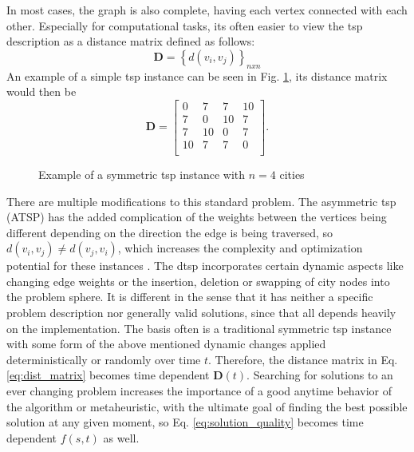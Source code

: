 In most cases, the graph is also complete, having each vertex connected with each other. Especially for computational tasks, its often easier to view the \gls{tsp} description as a distance matrix defined as follows:
\begin{equation} 
	\label{eq:dist_matrix}
	\textbf{D} = \left\lbrace d(v_i,v_j) \right\rbrace_{nxn}
\end{equation}
An example of a simple \gls{tsp} instance can be seen in Fig. \ref{fig:ExampleTSP}, its distance matrix would then be
$$
\textbf{D} =
 \begin{bmatrix}
	0 & 7 &7 & 10\\
	7 & 0 & 10 & 7\\
	7 & 10 & 0 & 7\\
	10 & 7 & 7 & 0\\
\end{bmatrix}
. $$
  \begin{figure}
  	\centering
    \caption{Example of a symmetric \gls{tsp} instance with $n=4$ cities}
    \label{fig:ExampleTSP}
\end{figure}


There are multiple modifications to this standard problem. The asymmetric \gls{tsp} (ATSP) has the added complication of the weights between the vertices being different depending on the direction the edge is being traversed, so $d(v_i, v_j) \neq d(v_j,v_i)$, which increases the complexity and optimization potential for these instances \cite{johnson2007experimental}.
The \gls{dtsp} incorporates certain dynamic aspects like changing edge weights or the insertion, deletion or swapping of city nodes into the problem sphere. It is different in the sense that it has neither a specific problem description nor generally valid solutions, since that all depends heavily on the implementation. The basis often is a traditional symmetric \gls{tsp} instance with some form of the above mentioned dynamic changes applied deterministically or randomly over time $t$. Therefore, the distance matrix in Eq. \eqref{eq:dist_matrix} becomes time dependent $\textbf{D}(t)$. Searching for solutions to an ever changing problem increases the importance of a good anytime behavior of the algorithm or metaheuristic, with the ultimate goal of finding the best possible solution at any given moment, so Eq. \eqref{eq:solution_quality} becomes time dependent $f(s,t)$ as well. 


